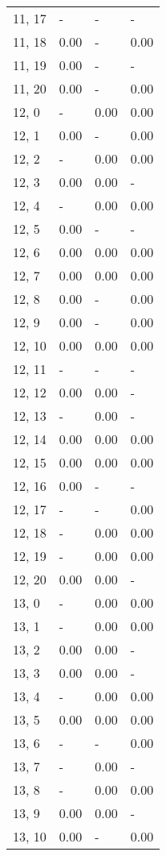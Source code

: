 \begin{table}
\begin{tabular}{llll}
11, 17 &     - &     - &     - \\
11, 18 &  0.00 &     - &  0.00 \\
11, 19 &  0.00 &     - &     - \\
11, 20 &  0.00 &     - &  0.00 \\
12, 0  &     - &  0.00 &  0.00 \\
12, 1  &  0.00 &     - &  0.00 \\
12, 2  &     - &  0.00 &  0.00 \\
12, 3  &  0.00 &  0.00 &     - \\
12, 4  &     - &  0.00 &  0.00 \\
12, 5  &  0.00 &     - &     - \\
12, 6  &  0.00 &  0.00 &  0.00 \\
12, 7  &  0.00 &  0.00 &  0.00 \\
12, 8  &  0.00 &     - &  0.00 \\
12, 9  &  0.00 &     - &  0.00 \\
12, 10 &  0.00 &  0.00 &  0.00 \\
12, 11 &     - &     - &     - \\
12, 12 &  0.00 &  0.00 &     - \\
12, 13 &     - &  0.00 &     - \\
12, 14 &  0.00 &  0.00 &  0.00 \\
12, 15 &  0.00 &  0.00 &  0.00 \\
12, 16 &  0.00 &     - &     - \\
12, 17 &     - &     - &  0.00 \\
12, 18 &     - &  0.00 &  0.00 \\
12, 19 &     - &  0.00 &  0.00 \\
12, 20 &  0.00 &  0.00 &     - \\
13, 0  &     - &  0.00 &  0.00 \\
13, 1  &     - &  0.00 &  0.00 \\
13, 2  &  0.00 &  0.00 &     - \\
13, 3  &  0.00 &  0.00 &     - \\
13, 4  &     - &  0.00 &  0.00 \\
13, 5  &  0.00 &  0.00 &  0.00 \\
13, 6  &     - &     - &  0.00 \\
13, 7  &     - &  0.00 &     - \\
13, 8  &     - &  0.00 &  0.00 \\
13, 9  &  0.00 &  0.00 &     - \\
13, 10 &  0.00 &     - &  0.00 \\

\end{tabular}
\end{table}
